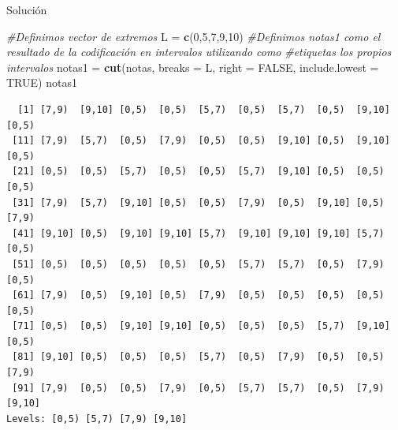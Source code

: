 \documentclass[
  ignorenonframetext,
]{beamer}
\newenvironment{Shaded}{\begin{snugshade}}{\end{snugshade}}
\newcommand{\AttributeTok}[1]{\textcolor[rgb]{0.13,0.29,0.53}{#1}}
\newcommand{\CommentTok}[1]{\textcolor[rgb]{0.56,0.35,0.01}{\textit{#1}}}
\newcommand{\ConstantTok}[1]{\textcolor[rgb]{0.56,0.35,0.01}{#1}}
\newcommand{\DecValTok}[1]{\textcolor[rgb]{0.00,0.00,0.81}{#1}}
\newcommand{\FunctionTok}[1]{\textcolor[rgb]{0.13,0.29,0.53}{\textbf{#1}}}
\newcommand{\NormalTok}[1]{#1}
\newcommand{\OtherTok}[1]{\textcolor[rgb]{0.56,0.35,0.01}{#1}}
\begin{document}
\begin{frame}[fragile]{Solución}
\label{soluciuxf3n-17}
\begin{Shaded}
\begin{Highlighting}[]
\CommentTok{\#Definimos vector de extremos}
\NormalTok{L }\OtherTok{=} \FunctionTok{c}\NormalTok{(}\DecValTok{0}\NormalTok{,}\DecValTok{5}\NormalTok{,}\DecValTok{7}\NormalTok{,}\DecValTok{9}\NormalTok{,}\DecValTok{10}\NormalTok{)}
\CommentTok{\#Definimos notas1 como el resultado de la codificación en intervalos utilizando como }
\CommentTok{\#etiquetas los propios intervalos}
\NormalTok{notas1 }\OtherTok{=} \FunctionTok{cut}\NormalTok{(notas, }\AttributeTok{breaks =}\NormalTok{ L, }\AttributeTok{right =} \ConstantTok{FALSE}\NormalTok{, }\AttributeTok{include.lowest =} \ConstantTok{TRUE}\NormalTok{)}
\NormalTok{notas1}
\end{Highlighting}
\end{Shaded}

\begin{verbatim}
  [1] [7,9)  [9,10] [0,5)  [0,5)  [5,7)  [0,5)  [5,7)  [0,5)  [9,10] [0,5) 
 [11] [7,9)  [5,7)  [0,5)  [7,9)  [0,5)  [0,5)  [9,10] [0,5)  [9,10] [0,5) 
 [21] [0,5)  [0,5)  [5,7)  [0,5)  [0,5)  [5,7)  [9,10] [0,5)  [0,5)  [0,5) 
 [31] [7,9)  [5,7)  [9,10] [0,5)  [0,5)  [7,9)  [0,5)  [9,10] [0,5)  [7,9) 
 [41] [9,10] [0,5)  [9,10] [9,10] [5,7)  [9,10] [9,10] [9,10] [5,7)  [0,5) 
 [51] [0,5)  [0,5)  [0,5)  [0,5)  [0,5)  [5,7)  [5,7)  [0,5)  [7,9)  [0,5) 
 [61] [7,9)  [0,5)  [9,10] [0,5)  [7,9)  [0,5)  [0,5)  [0,5)  [0,5)  [0,5) 
 [71] [0,5)  [0,5)  [9,10] [9,10] [0,5)  [0,5)  [0,5)  [5,7)  [9,10] [0,5) 
 [81] [9,10] [0,5)  [0,5)  [0,5)  [5,7)  [0,5)  [7,9)  [0,5)  [0,5)  [7,9) 
 [91] [7,9)  [0,5)  [0,5)  [7,9)  [0,5)  [5,7)  [5,7)  [0,5)  [7,9)  [9,10]
Levels: [0,5) [5,7) [7,9) [9,10]
\end{verbatim}
\end{frame}
\end{document}
